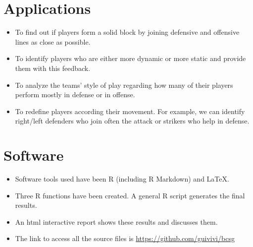 \documentclass{beamer}
\begin{document}
\section{Applications}
\begin{frame}{}

\begin{itemize}
\footnotesize
\item To find out if players form a solid block by joining defensive and offensive lines as close as possible.

\vspace*{0.6cm}

\item To identify players who are either more dynamic or more static and provide them with this feedback.

\vspace*{0.6cm}

\item To analyze the teams' style of play regarding how many of their players perform mostly in defense or in offense.

\vspace*{0.6cm}

\item To redefine players according their movement. For example, we can identify right/left defenders who join often the attack or strikers who help in defense.
\end{itemize}

\end{frame}

\section{Software}
\begin{frame}{}

\begin{itemize}
\footnotesize
\item Software tools used have been R (including R Markdown) and \LaTeX{}.

\vspace*{0.6cm}

\item Three R functions have been created. A general R script generates the final results.

\vspace*{0.6cm}

\item An html interactive report shows these results and discusses them.

\vspace*{0.6cm}

\item The link to access all the source files is \url{https://github.com/guivivi/bcsg}
\end{itemize}

\end{frame}
\end{document}
